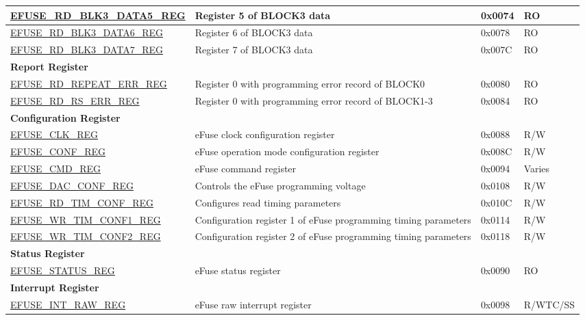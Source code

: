 \begin{longtable}{ | p{6cm} | p{7.2cm} | p{1.3cm} | p{1.5cm} | }
\hyperref[regdesc:EFUSERDBLK3DATA5REG]{EFUSE\_RD\_BLK3\_DATA5\_REG} & Register 5 of BLOCK3 data & 0x0074 & RO \\ \hline
\hyperref[regdesc:EFUSERDBLK3DATA6REG]{EFUSE\_RD\_BLK3\_DATA6\_REG} & Register 6 of BLOCK3 data & 0x0078 & RO \\ \hline
\hyperref[regdesc:EFUSERDBLK3DATA7REG]{EFUSE\_RD\_BLK3\_DATA7\_REG} & Register 7 of BLOCK3 data & 0x007C & RO \\ \hline
\multicolumn{4}{|l|}{\textbf{Report Register}} \\ \hline
\hyperref[regdesc:EFUSERDREPEATERRREG]{EFUSE\_RD\_REPEAT\_ERR\_REG} &  Register 0 with programming error record of BLOCK0 & 0x0080 & RO \\ \hline
\hyperref[regdesc:EFUSERDRSERRREG]{EFUSE\_RD\_RS\_ERR\_REG} & Register 0 with programming error record of BLOCK1-3 & 0x0084 & RO \\ \hline
\multicolumn{4}{|l|}{\textbf{Configuration Register}} \\ \hline
\hyperref[regdesc:EFUSECLKREG]{EFUSE\_CLK\_REG} & eFuse clock configuration register & 0x0088 & R/W \\ \hline
\hyperref[regdesc:EFUSECONFREG]{EFUSE\_CONF\_REG} & eFuse operation mode configuration register & 0x008C & R/W \\ \hline
\hyperref[regdesc:EFUSECMDREG]{EFUSE\_CMD\_REG} & eFuse command register & 0x0094 & Varies \\ \hline
\hyperref[regdesc:EFUSEDACCONFREG]{EFUSE\_DAC\_CONF\_REG} & Controls the eFuse programming voltage & 0x0108 & R/W \\ \hline
\hyperref[regdesc:EFUSERDTIMCONFREG]{EFUSE\_RD\_TIM\_CONF\_REG} & Configures read timing parameters & 0x010C & R/W \\ \hline
\hyperref[regdesc:EFUSEWRTIMCONF1REG]{EFUSE\_WR\_TIM\_CONF1\_REG} & Configuration register 1 of eFuse programming timing parameters & 0x0114 & R/W \\ \hline
\hyperref[regdesc:EFUSEWRTIMCONF2REG]{EFUSE\_WR\_TIM\_CONF2\_REG} & Configuration register 2 of eFuse programming timing parameters & 0x0118 & R/W \\ \hline
\multicolumn{4}{|l|}{\textbf{Status Register}} \\ \hline
\hyperref[regdesc:EFUSESTATUSREG]{EFUSE\_STATUS\_REG} & eFuse status register & 0x0090 & RO \\ \hline
\multicolumn{4}{|l|}{\textbf{Interrupt Register}} \\ \hline
\hyperref[regdesc:EFUSEINTRAWREG]{EFUSE\_INT\_RAW\_REG} & eFuse raw interrupt register & 0x0098 & R/WTC/SS \\ \hline

\end{longtable}
